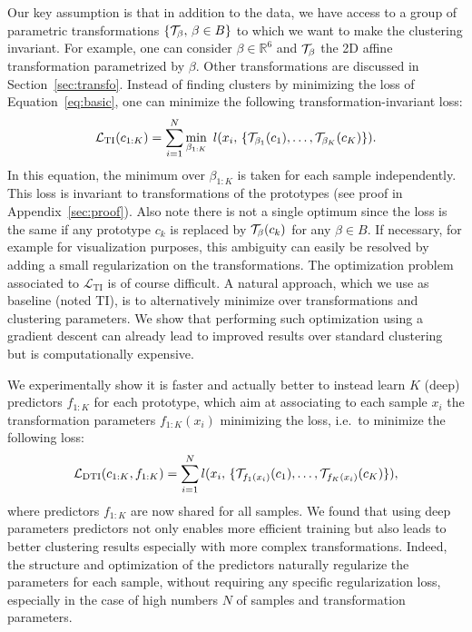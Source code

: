 \documentclass{article}
\begin{document}
Our key assumption is that in addition to the data, we have access to a group of parametric
transformations $\{{\mathcal T}_\beta,\, \beta\in B \}$ to which we want to make the clustering 
invariant. For example, one can consider $\beta \in \mathbb{R}^6$ and ${\mathcal T}_\beta$ the 2D 
affine transformation parametrized by $\beta$. Other transformations are discussed in 
Section~\ref{sec:transfo}. Instead of finding clusters by minimizing the loss of 
Equation~\ref{eq:basic}, one can minimize the following transformation-invariant loss:\begin{equation}
  \mathcal{L}_{\textrm{TI}}(c_{1:K})=\sum_{i=1}^N \min_{\beta_{1:K}}\  l(x_i,\,
  \{{\mathcal T}_{\beta_1}(c_1), \ldots,{\mathcal T}_{\beta_K}(c_K)\}).
    \label{eq:ti}
\end{equation}
In this equation, the minimum over $\beta_{1:K}$ is taken for each sample independently. This 
loss is invariant to transformations of the prototypes (see proof in 
Appendix~\ref{sec:proof}).  Also note there is not a single optimum since the loss is the 
same if any prototype $c_k$ is replaced by ${\mathcal T}_{\beta}(c_k)$ for any $\beta\in B$. If 
necessary, for example for visualization purposes, this ambiguity can easily be resolved by 
adding a small regularization on the transformations. The optimization problem associated to 
$\mathcal{L}_{\textrm{TI}}$ is of course difficult.
A natural approach, which we use as baseline (noted TI), is to alternatively minimize over 
transformations and clustering parameters. We show that performing such optimization using a 
gradient descent can already lead to improved results over standard clustering but is 
computationally expensive. 

\vspace{-0.3em}
We experimentally show it is faster and actually better to instead learn $K$ (deep) 
predictors $f_{1:K}$ for each prototype, which aim at associating to each sample $x_i$ the 
transformation parameters $f_{1:K}(x_i)$ minimizing the loss, i.e.\ to minimize the following 
loss:\begin{equation}
  \mathcal{L}_{\textrm{DTI}}(c_{1:K},f_{1:K})= \sum_{i=1}^N 
  l(x_i,\,\{{\mathcal T}_{f_1(x_i)}(c_1),
  \ldots,{\mathcal T}_{f_K(x_i)}(c_K)\}),
    \label{eq:dti}
\end{equation}
where predictors $f_{1:K}$ are now shared for all samples. We found that using deep 
parameters predictors not only enables more efficient training but also leads to better 
clustering results especially with more complex transformations. Indeed, the structure and 
optimization of the predictors naturally regularize the parameters for each sample, without 
requiring any specific regularization loss, especially in the case of high numbers $N$ of 
samples and transformation parameters.
\end{document}
